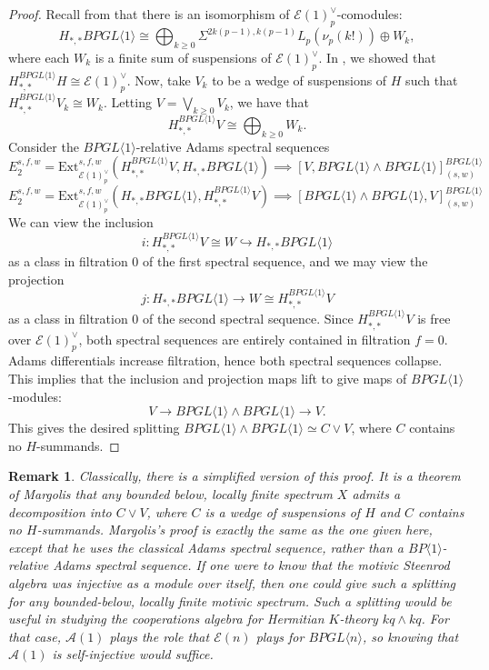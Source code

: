 \documentclass{amsart}
\newtheorem{remark}[theorem]{Remark}
\theoremstyle{plain}
\numberwithin{theorem}{section}
\numberwithin{equation}{section}
\numberwithin{figure}{section}
\newcommand{\cA}{{\mathcal A}}
\newcommand{\cE}{{\mathcal E}}
\newcommand{\0}{\langle 0 \rangle }
\begin{document}
\begin{proof}
    Recall from  that there is an isomorphism of $\mathcal{E}(1)_p^\vee$-comodules:
    \[H_{*,*}BPGL \langle 1 \rangle \cong \bigoplus_{k \geq 0}\Sigma^{2k(p-1), k(p-1)}L_p(\nu_p(k!)) \oplus W_k,\]
    where each $W_k$ is a finite sum of suspensions of $\mathcal{E}(1)^\vee_p$. In , we showed that $H_{*,*}^{BPGL \langle 1 \rangle}H \cong \mathcal{E}(1)^\vee_p$. Now, take $V_k$ to be a wedge of suspensions of $H$ such that $H^{BPGL \langle 1 \rangle}_{*,*}V_k \cong W_k$. Letting $V = \bigvee_{k \geq 0}V_k$, we have that 
    \[H^{BPGL \langle 1 \rangle}_{*,*}V \cong \bigoplus_{k \geq 0}W_k.\]
    Consider the $BPGL \langle 1 \rangle$-relative Adams spectral sequences
    \[E_2^{s,f,w} = \text{Ext}^{s,f,w}_{\mathcal{E}(1)^\vee_p}(H_{*,*}^{BPGL \langle 1 \rangle}V, H_{*,*}BPGL \langle 1 \rangle) \implies [V, BPGL \langle1 \rangle \wedge BPGL \langle 1 \rangle]^{BPGL \langle 1 \rangle}_{(s,w)}\]
    \[E_2^{s,f,w} = \text{Ext}^{s,f,w}_{\mathcal{E}(1)^\vee_p}(H_{*,*}BPGL \langle 1 \rangle, H^{BPGL \langle 1 \rangle}_{*,*}V) \implies [BPGL \langle 1 \rangle \wedge BPGL \langle 1 \rangle, V]^{BPGL \langle 1 \rangle}_{(s,w)}\]
    We can view the inclusion
    \[i:H_{*,*}^{BPGL \langle 1 \rangle}V \cong W \hookrightarrow H_{*,*}BPGL \langle 1 \rangle\]
    as a class in filtration 0 of the first spectral sequence, and we may view the projection
    \[j:H_{*,*}BPGL \langle 1 \rangle \to W \cong H^{BPGL \langle 1 \rangle}_{*,*}V\]
    as a class in filtration 0 of the second spectral sequence. Since  $H_{*,*}^{BPGL \langle 1 \rangle}V$ is free over $\mathcal{E}(1)^\vee_p$, both spectral sequences are entirely contained in filtration $f=0$. Adams differentials increase filtration, hence both spectral sequences collapse. This implies that the inclusion and projection maps lift to give maps of $BPGL \langle 1 \rangle$-modules:
    \[V \to BPGL \langle 1 \rangle \wedge BPGL \langle 1 \rangle \to V.\]
    This gives the desired splitting $BPGL \langle 1 \rangle \wedge BPGL \langle 1 \rangle \simeq C \vee V$, where $C$ contains no $H$-summands.
\end{proof}

\begin{remark}
    \rm Classically, there is a simplified version of this proof. It is a theorem of Margolis \cite{Margolis74} that \textit{any} bounded below, locally finite spectrum $X$ admits a decomposition into $C \vee V$, where $C$ is a wedge of suspensions of $H$ and $C$ contains no $H$-summands. Margolis's proof is exactly the same as the one given here, except that he uses the classical Adams spectral sequence, rather than a $BP\langle 1 \rangle$-relative Adams spectral sequence. If one were to know that the motivic Steenrod algebra was injective as a module over itself, then one could give such a splitting for any bounded-below, locally finite motivic spectrum. Such a splitting would be useful in studying the cooperations algebra for Hermitian $K$-theory $kq \wedge kq$. For that case, $\cA(1)$ plays the role that $\cE(n)$ plays for $BPGL\langle n \rangle$, so knowing that $\cA(1)$ is self-injective would suffice. 
\end{remark}
\end{document}

